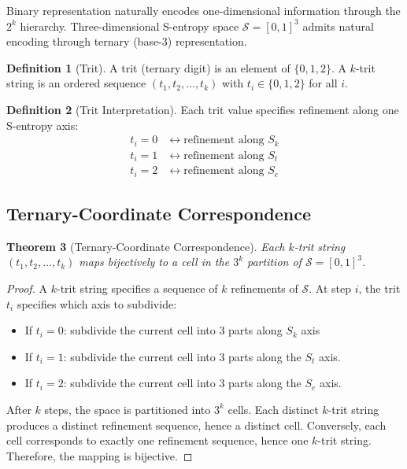 \documentclass[11pt,twocolumn,a4paper]{article}
\newtheorem{theorem}{Theorem}[section]
\theoremstyle{definition}
\newtheorem{definition}[theorem]{Definition}
\theoremstyle{remark}
\newcommand{\Sspace}{\mathcal{S}}
\newcommand{\Sk}{S_k}
\newcommand{\St}{S_t}
\newcommand{\Se}{S_e}
\begin{document}
Binary representation naturally encodes one-dimensional information through the $2^k$ hierarchy. Three-dimensional S-entropy space $\Sspace = [0,1]^3$ admits natural encoding through ternary (base-3) representation.

\begin{definition}[Trit]
\label{def:trit}
A trit (ternary digit) is an element of $\{0,1,2\}$. A $k$-trit string is an ordered sequence $(t_1, t_2, \ldots, t_k)$ with $t_i \in \{0,1,2\}$ for all $i$.
\end{definition}

\begin{definition}[Trit Interpretation]
\label{def:trit_interpretation}
Each trit value specifies refinement along one S-entropy axis:
\begin{align}
t_i = 0 &\leftrightarrow \text{refinement along } \Sk \label{eq:trit_0} \\
t_i = 1 &\leftrightarrow \text{refinement along } \St \label{eq:trit_1} \\
t_i = 2 &\leftrightarrow \text{refinement along } \Se \label{eq:trit_2}
\end{align}
\end{definition}

\subsection{Ternary-Coordinate Correspondence}

\begin{theorem}[Ternary-Coordinate Correspondence]
\label{thm:ternary_correspondence}
Each $k$-trit string $(t_1,t_2,\ldots,t_k)$ maps bijectively to a cell in the $3^k$ partition of $\Sspace = [0,1]^3$.
\end{theorem}

\begin{proof}
A $k$-trit string specifies a sequence of $k$ refinements of $\Sspace$. At step $i$, the trit $t_i$ specifies which axis to subdivide:
\begin{itemize}
\item If $t_i = 0$: subdivide the current cell into 3 parts along $\Sk$ axis
\item If $t_i = 1$: subdivide the current cell into 3 parts along the $\St$ axis.  
\item If $t_i = 2$: subdivide the current cell into 3 parts along the $\Se$ axis.
\end{itemize}

After $k$ steps, the space is partitioned into $3^k$ cells. Each distinct $k$-trit string produces a distinct refinement sequence, hence a distinct cell. Conversely, each cell corresponds to exactly one refinement sequence, hence one $k$-trit string. Therefore, the mapping is bijective.
\end{proof}
\end{document}
